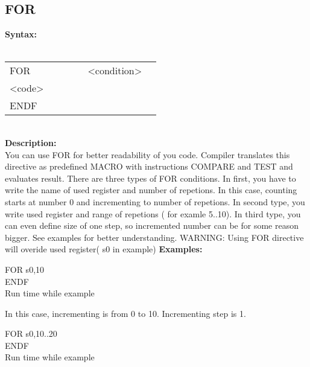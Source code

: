         \subsection{FOR}
            \textbf{Syntax:}\\
            \\ {
                \texttt{}
                    \begin{tabular}[h!]{llll}
                        { \color{highlight_directive} FOR } & \verb'     ' &
                        { \color{highlight_constant} <condition> }\\
                        { \color{highlight_symbol} <code> }\\
                        { \color{highlight_directive} ENDF }
                    \end{tabular}
                }\\
            \textbf{Description:}\\
            You can use FOR for better readability of you code. Compiler translates this directive as predefined MACRO with instructions COMPARE and TEST and
            evaluates result. There are three types of FOR conditions. In first, you have to write the name of used register and number of repetions. In this case,
            counting starts at number 0 and incrementing to number of repetions. In second type, you write used register and range of
            repetions ( for examle 5..10). In third type, you can even define size of one step, so incremented number can be for some reason bigger.
            See examples for better understanding. WARNING: Using FOR directive will overide used register( s0 in example)
            \textbf{Examples:}\\
                    \begin{code}[h!]
                            { \color{highlight_directive} FOR  }
                            { \color{highlight_constant}   s0,10 }\\
                            { \color{highlight_directive}  ENDF}\\
                        \caption{Run time while example}
                    \end{code}
            In this case, incrementing is from 0 to 10. Incrementing step is 1.
                    \begin{code}[h!]
                            { \color{highlight_directive} FOR  }
                            { \color{highlight_constant}   s0,10..20 }\\
                            { \color{highlight_directive}  ENDF}\\
                        \caption{Run time while example}
                    \end{code}
